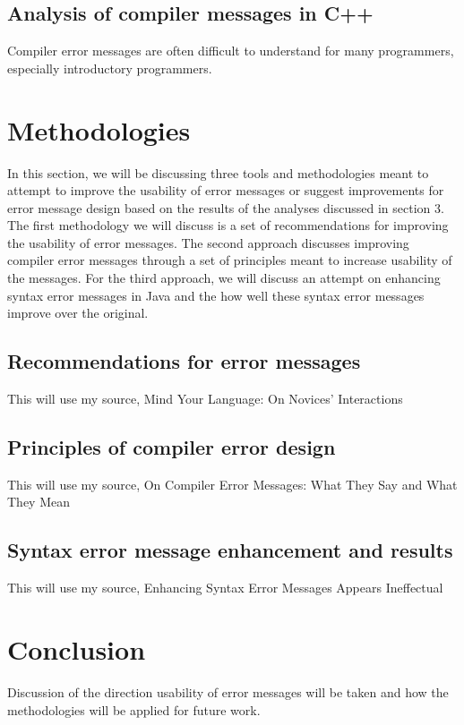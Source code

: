 \documentclass{sig-alternate}
\begin{document}

\subsection{Analysis of compiler messages in C++}
Compiler error messages are often difficult to understand for many programmers, especially introductory programmers. 


\section{Methodologies}
In this section, we will be discussing three tools and methodologies meant to attempt to improve the usability of error messages or suggest improvements for error message design based on the results of the analyses discussed in section 3. The first methodology we will discuss is a set of recommendations for improving the usability of error messages. The second approach discusses improving compiler error messages through a set of principles meant to increase usability of the messages. For the third approach, we will discuss an attempt on enhancing syntax error messages in Java and the how well these syntax error messages improve over the original. 

\subsection{Recommendations for error messages}
This will use my source, Mind Your Language: On Novices' Interactions 

\subsection{Principles of compiler error design}
This will use my source, On Compiler Error Messages: What They Say and What They Mean

\subsection{Syntax error message enhancement and results}
This will use my source, Enhancing Syntax Error Messages Appears Ineffectual


\section{Conclusion}
Discussion of the direction usability of error messages will be taken and how the methodologies will be applied for future work.
\end{document}
